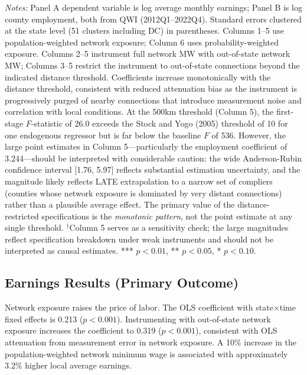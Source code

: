 \documentclass[12pt]{article}
\begin{document}
\begin{table}[t]
\begin{threeparttable}
\begin{tablenotes}[flushleft]
\item \textit{Notes:} Panel A dependent variable is log average monthly earnings; Panel B is log county employment, both from QWI (2012Q1--2022Q4). Standard errors clustered at the state level (51 clusters including DC) in parentheses. Columns 1--5 use population-weighted network exposure; Column 6 uses probability-weighted exposure. Columns 2--5 instrument full network MW with out-of-state network MW; Columns 3--5 restrict the instrument to out-of-state connections beyond the indicated distance threshold. Coefficients increase monotonically with the distance threshold, consistent with reduced attenuation bias as the instrument is progressively purged of nearby connections that introduce measurement noise and correlation with local conditions. At the 500km threshold (Column 5), the first-stage $F$-statistic of 26.0 exceeds the Stock and Yogo (2005) threshold of 10 for one endogenous regressor but is far below the baseline $F$ of 536. However, the large point estimates in Column 5---particularly the employment coefficient of 3.244---should be interpreted with considerable caution: the wide Anderson-Rubin confidence interval [1.76, 5.97] reflects substantial estimation uncertainty, and the magnitude likely reflects LATE extrapolation to a narrow set of compliers (counties whose network exposure is dominated by very distant connections) rather than a plausible average effect. The primary value of the distance-restricted specifications is the \textit{monotonic pattern}, not the point estimate at any single threshold. $^{\dagger}$Column 5 serves as a sensitivity check; the large magnitudes reflect specification breakdown under weak instruments and should not be interpreted as causal estimates. *** $p<0.01$, ** $p<0.05$, * $p<0.10$.
\end{tablenotes}
\end{threeparttable}
\end{table}

\subsection{Earnings Results (Primary Outcome)}

Network exposure raises the price of labor. The OLS coefficient with state$\times$time fixed effects is 0.213 ($p < 0.001$). Instrumenting with out-of-state network exposure increases the coefficient to 0.319 ($p < 0.001$), consistent with OLS attenuation from measurement error in network exposure. A 10\% increase in the population-weighted network minimum wage is associated with approximately 3.2\% higher local average earnings.
\end{document}
